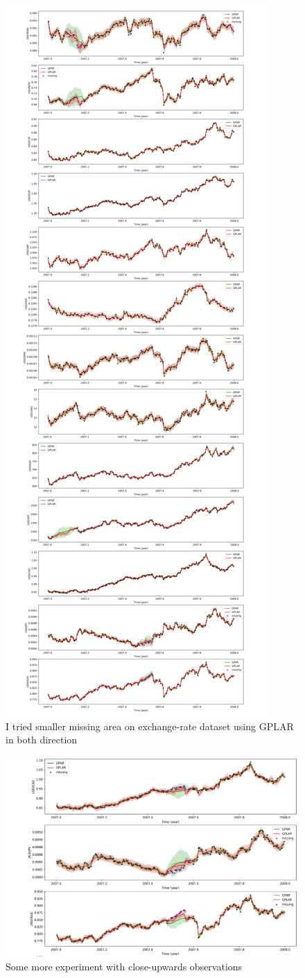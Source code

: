 \documentclass{article}
\begin{document}
\newpage
\begin{figure}[H]
\centering
\includegraphics[width=.6\linewidth]{exchange-bi.png}
\caption{I tried smaller missing area on exchange-rate dataset using GPLAR in both direction}
\end{figure}

\begin{figure}[H]
\centering
\includegraphics[width=.8\linewidth]{exchange-1.png}
\caption{Some more experiment with close-upwards observations}
\end{figure}
\end{document}
